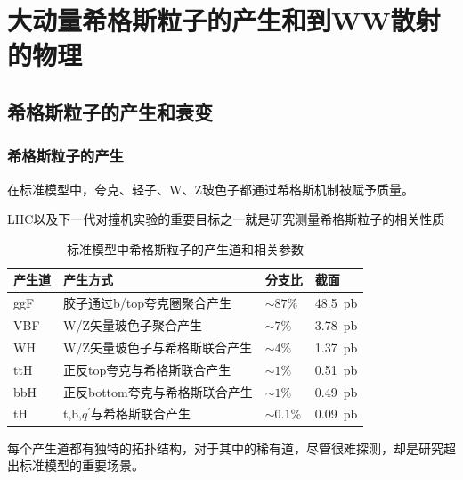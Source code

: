 \chapter{大动量希格斯粒子的产生和到WW散射的物理}
\label{chap2}
\fontsize{12bp}{14.4pt}

\section{希格斯粒子的产生和衰变}
\subsection{希格斯粒子的产生}


在标准模型中，夸克、轻子、W、Z玻色子都通过希格斯机制被赋予质量。

LHC以及下一代对撞机实验的重要目标之一就是研究测量希格斯粒子的相关性质

\begin{table}[htbp]
    \caption{标准模型中希格斯粒子的产生道和相关参数}\label{table:2.1}
    \centering
    \begin{tabular}{>{\centering\arraybackslash}p{2cm}%
    >{\centering\arraybackslash}p{7cm}%
    >{\centering\arraybackslash}p{2cm}%
    >{\centering\arraybackslash}p{2cm}}
    \toprule\toprule
    \textbf{产生道} & \textbf{产生方式} & \textbf{分支比} & \textbf{截面}\\
    \midrule
    ggF & 胶子通过b/top夸克圈聚合产生 & $\sim 87\%$ & \SI{48.5}{pb}\\
    VBF & W/Z矢量玻色子聚合产生 & $\sim7\%$ & \SI{3.78}{pb}\\
    WH & W/Z矢量玻色子与希格斯联合产生 & $\sim 4\%$ & \SI{1.37}{pb}\\
    ttH & 正反top夸克与希格斯联合产生 & $\sim1\%$ & \SI{0.51}{pb}\\
    bbH & 正反bottom夸克与希格斯联合产生 &  $\sim 1\%$ & \SI{0.49}{pb}\\
    tH & t,b,$q^\prime$与希格斯联合产生 & $\sim 0.1\%$ & \SI{0.09}{pb}\\
    \bottomrule\bottomrule
\end{tabular}
\end{table}
每个产生道都有独特的拓扑结构，对于其中的稀有道，尽管很难探测，却是研究超出标准模型的重要场景。


